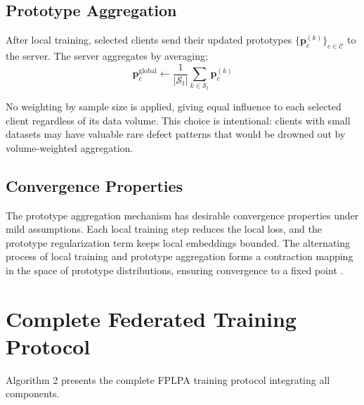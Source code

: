 \subsection{Prototype Aggregation}

After local training, selected clients send their updated prototypes \(\{\mathbf{p}_c^{(k)}\}_{c \in \mathcal{C}}\) to the server. The server aggregates by averaging:
\[
\mathbf{p}_c^{\text{global}} \leftarrow \frac{1}{|\mathcal{S}_t|} \sum_{k \in \mathcal{S}_t} \mathbf{p}_c^{(k)}
\]

No weighting by sample size is applied, giving equal influence to each selected client regardless of its data volume. This choice is intentional: clients with small datasets may have valuable rare defect patterns that would be drowned out by volume-weighted aggregation.

\subsection{Convergence Properties}

The prototype aggregation mechanism has desirable convergence properties under mild assumptions. Each local training step reduces the local loss, and the prototype regularization term keeps local embeddings bounded. The alternating process of local training and prototype aggregation forms a contraction mapping in the space of prototype distributions, ensuring convergence to a fixed point \citep{tan2022fedproto}.

\section{Complete Federated Training Protocol}

Algorithm 2 presents the complete FPLPA training protocol integrating all components.

